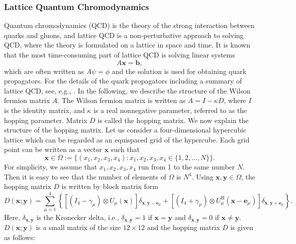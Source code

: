 \subsubsection{{Lattice Quantum Chromodynamics}}\label{subsec:lattice-qcd}
{Quantum chromodynamics (QCD) is the theory of the strong interaction between quarks and gluons, and lattice QCD is a non-perturbative approach to solving QCD, where the theory is formulated on a lattice in space and time. It is known that the most time-consuming part of lattice QCD is solving linear systems}
\[A\boldsymbol{x}=\boldsymbol{b},\]
{which are often written as $A\psi=\phi$ and the solution is used for obtaining quark propagators. For the details of the quark propagators including a summary of lattice QCD, see, e.g., . In the following, we describe the structure of the Wilson fermion matrix $A$.}
{The Wilson fermion matrix is written as $A=I-\kappa D$, where $I$ is the identity matrix, and $\kappa$ is a real nonnegative parameter, referred to as the hopping parameter. Matrix $D$ is called the hopping matrix. We now explain the structure of the hopping matrix.}
{Let us consider a four-dimensional hypercubic lattice which can be regarded as an equispaced grid of the hypercube. Each grid point can be written as a vector $\boldsymbol{x}$ such that}
\[\boldsymbol{x}\in\Omega:=\{(x_1,x_2,x_3,x_4):x_1,x_2,x_3,x_4\in\{1,2,\ldots,N\}\}.\]
{For simplicity, we assume that $x_1,x_2,x_3,x_4$ run from 1 to the same number $N$. Then it is easy to see that the number of elements of $\Omega$ is $N^4$. Using $\boldsymbol{x},\boldsymbol{y}\in\Omega$, the hopping matrix $D$ is written by block matrix form}
\begin{equation}\label{eq:wilson-hopping-block}
D(\boldsymbol{x};\boldsymbol{y})=\sum_{\mu=1}^4\left\{[(I_4-\gamma_\mu)\otimes U_\mu(\boldsymbol{x})]\delta_{\boldsymbol{x},\boldsymbol{y}-\boldsymbol{e}_\mu}
+[(I_4+\gamma_\mu)\otimes U_\mu^{\mathrm H}(\boldsymbol{x}-\boldsymbol{e}_\mu)]\delta_{\boldsymbol{x},\boldsymbol{y}+\boldsymbol{e}_\mu}\right\}.
\end{equation}
{Here, $\delta_{\boldsymbol{x},\boldsymbol{y}}$ is the Kronecker delta, i.e., $\delta_{\boldsymbol{x},\boldsymbol{y}}=1$ if $\boldsymbol{x}=\boldsymbol{y}$ and $\delta_{\boldsymbol{x},\boldsymbol{y}}=0$ if $\boldsymbol{x}\ne\boldsymbol{y}$. $D(\boldsymbol{x};\boldsymbol{y})$ is a small matrix of the size $12\times12$ and the hopping matrix $D$ is given as follows:}
